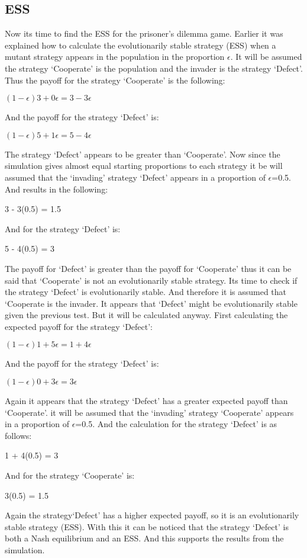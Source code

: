 \subsection{ESS}
Now its time to find the ESS for the prisoner's dilemma game. Earlier it was explained how to calculate the evolutionarily stable strategy (ESS) when a mutant strategy appears in the population in the proportion $\epsilon$. It will be assumed the strategy  `Cooperate' is the population and the invader is the strategy `Defect'. Thus the payoff for the strategy `Cooperate' is the following:
\begin{center}
$(1-{\epsilon})3 + 0{\epsilon} = 3 - 3{\epsilon}$
\end{center}
And the payoff for the strategy `Defect' is:
\begin{center}
$(1-{\epsilon})5 + 1{\epsilon} = 5 - 4{\epsilon}$
\end{center}
The strategy `Defect' appears to be greater than `Cooperate'. Now since the simulation gives almost equal starting proportions to each strategy it be will assumed that the `invading' strategy `Defect' appears in a proportion of $\epsilon$=0.5. And results in  the following:
\begin{center}
3 - 3(0.5) = 1.5
\end{center}
And for the strategy `Defect' is:
\begin{center}
 5 - 4(0.5) = 3
\end{center}
The payoff for `Defect' is greater than the payoff for `Cooperate' thus it can be said that `Cooperate' is not an evolutionarily stable strategy.
Its time to check if the strategy `Defect' is evolutionarily stable. And therefore it is assumed that `Cooperate is the invader. It  appears that `Defect' might be evolutionarily stable given the previous test. But it will be calculated anyway. First calculating the expected payoff for the strategy `Defect':
\begin{center}
$(1-{\epsilon})1 + 5{\epsilon} = 1 + 4{\epsilon}$
\end{center}
And the payoff for the strategy `Defect' is:
\begin{center}
$(1-{\epsilon})0 + 3{\epsilon} =  3{\epsilon}$
\end{center}
Again it appears that the strategy `Defect' has a greater expected payoff than `Cooperate'. it will be assumed that the `invading' strategy `Cooperate' appears in a proportion of $\epsilon$=0.5. And the calculation for the strategy `Defect' is as follows:
\begin{center}
1 +  4(0.5) = 3
\end{center}
And for the strategy `Cooperate' is:
\begin{center}
 3(0.5) = 1.5
\end{center}
Again the strategy`Defect' has a higher expected payoff, so it is an evolutionarily stable strategy (ESS).
With this it can be noticed that the strategy `Defect' is both a Nash equilibrium and an ESS. And this supports the results from the simulation.



